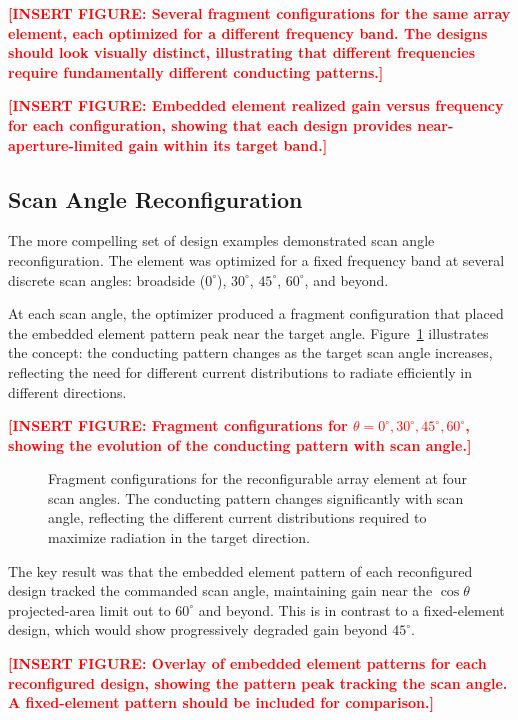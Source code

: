 \textcolor{red}{\textbf{[INSERT FIGURE: Several fragment configurations for the same array element, each optimized for a different frequency band.  The designs should look visually distinct, illustrating that different frequencies require fundamentally different conducting patterns.]}}

\textcolor{red}{\textbf{[INSERT FIGURE: Embedded element realized gain versus frequency for each configuration, showing that each design provides near-aperture-limited gain within its target band.]}}

\subsection{Scan Angle Reconfiguration}

The more compelling set of design examples demonstrated scan angle reconfiguration.  The element was optimized for a fixed frequency band at several discrete scan angles: broadside ($0^{\circ}$), $30^{\circ}$, $45^{\circ}$, $60^{\circ}$, and beyond.

At each scan angle, the optimizer produced a fragment configuration that placed the embedded element pattern peak near the target angle.  Figure~\ref{fig:RCA_scanconfigs} illustrates the concept: the conducting pattern changes as the target scan angle increases, reflecting the need for different current distributions to radiate efficiently in different directions.

\textcolor{red}{\textbf{[INSERT FIGURE: Fragment configurations for $\theta = 0^{\circ}, 30^{\circ}, 45^{\circ}, 60^{\circ}$, showing the evolution of the conducting pattern with scan angle.]}}
\begin{figure}
\caption[Reconfigurable element fragment configurations at four scan angles]{Fragment configurations for the reconfigurable array element at four scan angles.  The conducting pattern changes significantly with scan angle, reflecting the different current distributions required to maximize radiation in the target direction.}
\label{fig:RCA_scanconfigs}
\end{figure}

The key result was that the embedded element pattern of each reconfigured design tracked the commanded scan angle, maintaining gain near the $\cos\theta$ projected-area limit out to $60^{\circ}$ and beyond.  This is in contrast to a fixed-element design, which would show progressively degraded gain beyond $45^{\circ}$.

\textcolor{red}{\textbf{[INSERT FIGURE: Overlay of embedded element patterns for each reconfigured design, showing the pattern peak tracking the scan angle.  A fixed-element pattern should be included for comparison.]}}

